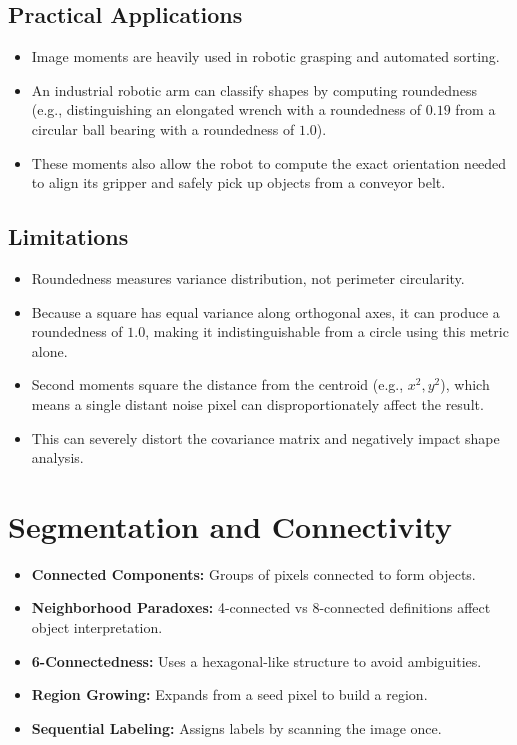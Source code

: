 \documentclass[12pt]{article}
\begin{document}
\subsection{Practical Applications}
\begin{itemize}
    \item Image moments are heavily used in robotic grasping and automated sorting.

    \item An industrial robotic arm can classify shapes by computing roundedness (e.g., distinguishing an elongated wrench with a roundedness of $0.19$ from a circular ball bearing with a roundedness of $1.0$).

    \item These moments also allow the robot to compute the exact orientation needed to align its gripper and safely pick up objects from a conveyor belt.
\end{itemize}

\subsection{Limitations}
\begin{itemize}
    \item Roundedness measures variance distribution, not perimeter circularity.

    \item Because a square has equal variance along orthogonal axes, it can produce a roundedness of $1.0$, making it indistinguishable from a circle using this metric alone.

    \item Second moments square the distance from the centroid (e.g., $x^2, y^2$), which means a single distant noise pixel can disproportionately affect the result.

    \item This can severely distort the covariance matrix and negatively impact shape analysis.
\end{itemize}



\section{Segmentation and Connectivity}
\begin{itemize}
    \item \textbf{Connected Components:} Groups of pixels connected to form objects.
    \item \textbf{Neighborhood Paradoxes:} 4-connected vs 8-connected definitions affect object interpretation.
    \item \textbf{6-Connectedness:} Uses a hexagonal-like structure to avoid ambiguities.
    \item \textbf{Region Growing:} Expands from a seed pixel to build a region.
    \item \textbf{Sequential Labeling:} Assigns labels by scanning the image once.
\end{itemize}
\end{document}
